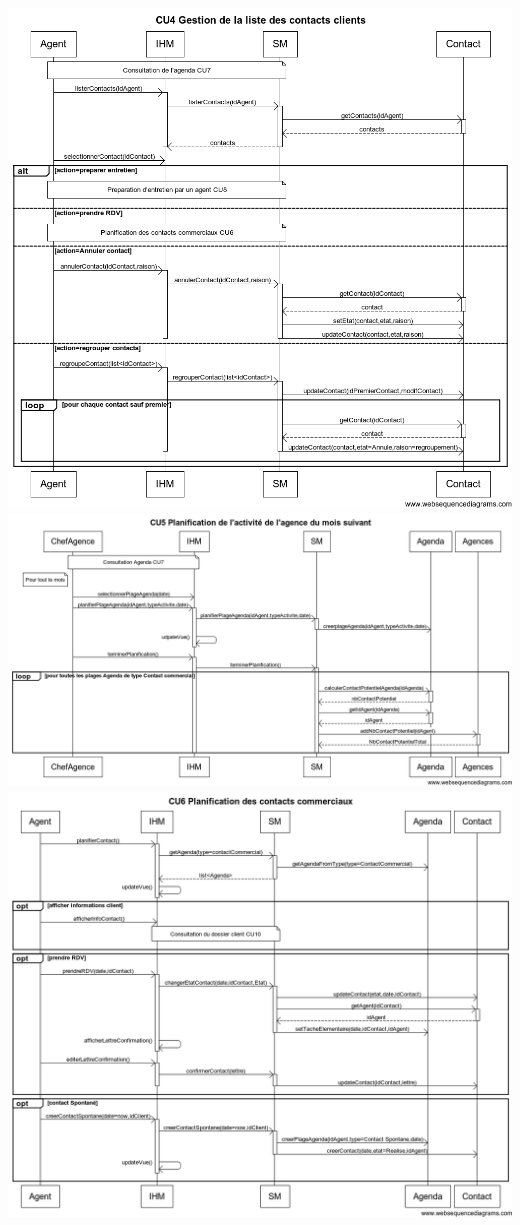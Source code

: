 \begin {center}
\includegraphics[width=\textwidth]{../../webSequenceDiagrameSources/cu4.png}
\includegraphics[width=\textwidth]{../../webSequenceDiagrameSources/cu5.png}
\includegraphics[width=\textwidth]{../../webSequenceDiagrameSources/cu6.png}

\end{center}
